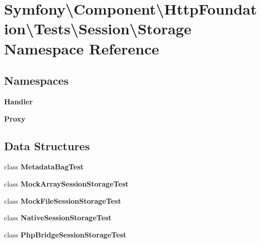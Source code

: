 \section{Symfony\textbackslash{}Component\textbackslash{}Http\+Foundation\textbackslash{}Tests\textbackslash{}Session\textbackslash{}Storage Namespace Reference}
\label{namespace_symfony_1_1_component_1_1_http_foundation_1_1_tests_1_1_session_1_1_storage}
\subsection*{Namespaces}
\begin{DoxyCompactItemize}
\item 
 {\bf Handler}
\item 
 {\bf Proxy}
\end{DoxyCompactItemize}
\subsection*{Data Structures}
\begin{DoxyCompactItemize}
\item 
class {\bf Metadata\+Bag\+Test}
\item 
class {\bf Mock\+Array\+Session\+Storage\+Test}
\item 
class {\bf Mock\+File\+Session\+Storage\+Test}
\item 
class {\bf Native\+Session\+Storage\+Test}
\item 
class {\bf Php\+Bridge\+Session\+Storage\+Test}
\end{DoxyCompactItemize}
